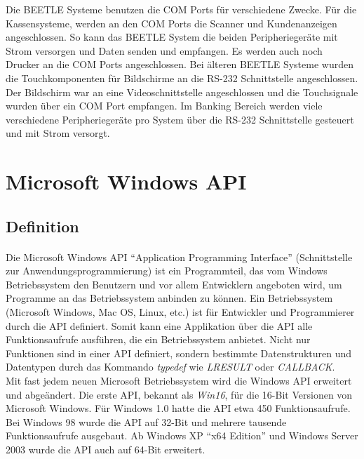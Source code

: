 Die BEETLE Systeme benutzen die COM Ports für verschiedene Zwecke. Für die Kassensysteme, werden an den COM Ports die Scanner und Kundenanzeigen angeschlossen. So kann das BEETLE System die beiden Peripheriegeräte mit Strom versorgen und Daten senden und empfangen. Es werden auch noch Drucker an die COM Ports angeschlossen. Bei älteren BEETLE Systeme wurden die Touchkomponenten für Bildschirme an die RS-232 Schnittstelle angeschlossen. Der Bildschirm war an eine Videoschnittstelle angeschlossen und die Touchsignale wurden über ein COM Port empfangen. Im Banking Bereich werden viele verschiedene Peripheriegeräte pro System über die RS-232 Schnittstelle gesteuert und mit Strom versorgt.



\newpage





\section{Microsoft Windows API}
\subsection{Definition}

\paragraph{}
Die Microsoft Windows API "`Application Programming Interface"' (Schnittstelle zur Anwendungsprogrammierung) ist ein Programmteil, das vom Windows Betriebssystem den Benutzern und vor allem Entwicklern angeboten wird, um Programme an das Betriebssystem anbinden zu können. Ein Betriebssystem (Microsoft Windows, Mac OS, Linux, etc.) ist für Entwickler und Programmierer durch die API definiert. Somit kann eine Applikation über die API alle Funktionsaufrufe ausführen, die ein Betriebssystem anbietet. Nicht nur Funktionen sind in einer API definiert, sondern bestimmte Datenstrukturen und Datentypen durch das Kommando \textit{typedef} wie \textit{LRESULT} oder \textit{CALLBACK}.
\\

Mit fast jedem neuen Microsoft Betriebssystem wird die Windows API erweitert und abgeändert. Die erste API, bekannt als \textit{Win16}, für die 16-Bit Versionen von Microsoft Windows. Für Windows 1.0 hatte die API etwa 450 Funktionsaufrufe. Bei Windows 98 wurde die API auf 32-Bit und mehrere tausende Funktionsaufrufe ausgebaut. Ab Windows XP "`x64 Edition"' und Windows Server 2003 wurde die API auch auf 64-Bit erweitert.
\\

